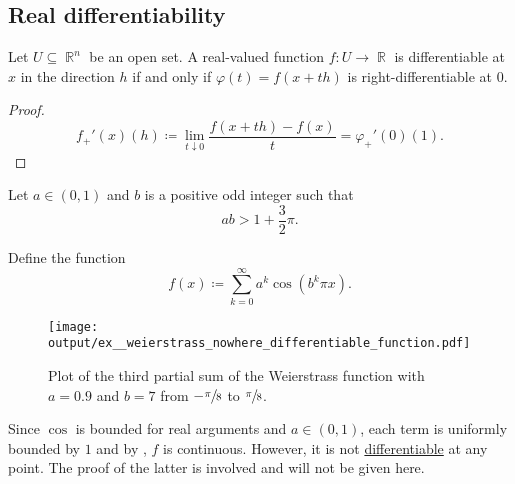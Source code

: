 \subsection{Real differentiability}\label{subsec:real_differentiability}

\begin{proposition}\label{thm:real_valued_differentiability}
  Let \( U \subseteq \BbbR^n \) be an open set. A real-valued function \( f: U \to \BbbR \) is differentiable at \( x \) in the direction \( h \) if and only if \( \varphi(t) = f(x + th) \) is right-differentiable at \( 0 \).
\end{proposition}
\begin{proof}
  \begin{equation*}
    f_+'(x)(h) \coloneqq \lim_{t \downarrow 0} \frac {f(x + th) - f(x)} t = \varphi_+'(0)(1).
  \end{equation*}
\end{proof}

\begin{example}\label{ex:weierstrass_nowhere_differentiable_function}
  Let \( a \in (0, 1) \) and \( b \) is a positive odd integer such that
  \begin{equation*}
    ab > 1 + \frac 3 2 \pi.
  \end{equation*}

  Define the function
  \begin{equation*}
    f(x) \coloneqq \sum_{k=0}^\infty a^k \cos(b^k \pi x).
  \end{equation*}

  \begin{figure}[!ht]
    \centering
    \texttt{[image: output/ex\_\_weierstrass\_nowhere\_differentiable\_function.pdf]}
    \caption
    {
      Plot of the third partial sum of the Weierstrass function with \( a = 0.9 \) and \( b = 7 \) from \( -\sfrac \pi 8 \) to \( \sfrac \pi 8 \).
    }
    \label{fig:ex:weierstrass_nowhere_differentiable_function/plot}
  \end{figure}

  Since \( \cos \) is bounded for real arguments and \( a \in (0, 1) \), each term is uniformly bounded by \( 1 \) and by , \( f \) is continuous. However, it is not \hyperref[def:differentiability]{differentiable} at any point. The proof of the latter is involved and will not be given here.
\end{example}

